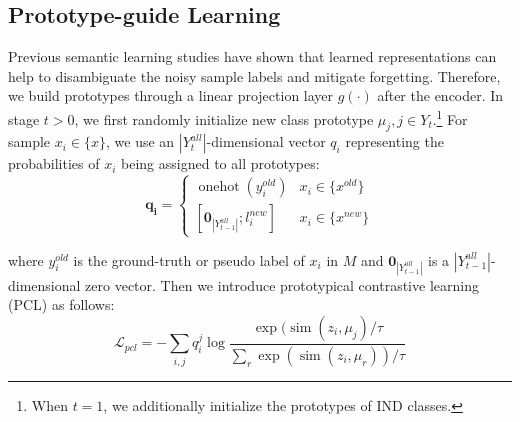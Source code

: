\documentclass[11pt]{article}
\begin{document}
\subsection{Prototype-guide Learning}
Previous semantic learning studies \cite{yu2020semantic,wang2022pico,ma-etal-2022-decomposed,10095149,dong2023multitask} have shown that learned representations can help to disambiguate the noisy sample labels and mitigate forgetting. Therefore, we build prototypes through a linear projection layer $g(\cdot)$ after the encoder.
In stage $t>0$, we first randomly initialize new class prototype $\mu_j,j\in Y_t$.\footnote{When $t=1$, we additionally initialize the prototypes of IND classes. } For sample $x_i\in \{x\}$, we use an $|Y^{all}_t|$-dimensional vector $q_{i}$ representing the probabilities of $x_i$ being assigned to all prototypes:
\begin{equation}
\boldsymbol{q_i}= \begin{cases}{\operatorname{onehot}(y^{old}_i)} & {x_i} \in \{x^{old}\} \\ {\left[\mathbf{0}_{|Y^{all}_{t-1}|}; l_{i}^{new}\right]} & {x_i} \in \{x^{new}\}\end{cases}
\end{equation}

where $y^{old}_i$ is the ground-truth or pseudo label of $x_i$ in $M$ and $\mathbf{0}_{|Y^{all}_{t-1}|}$ is a $|Y^{all}_{t-1}|$-dimensional zero vector. Then we introduce prototypical contrastive learning (PCL) \cite{li2020prototypical} as follows:
\begin{equation}
    \mathcal{L}_{pcl}=-\sum_{i,j}q^j_i\operatorname{log}\frac{\operatorname{exp}(\operatorname{sim}(z_i,\mu_j)/\tau}{\sum_{r}\operatorname{exp}(\operatorname{sim}(z_i,\mu_r))/\tau}
\end{equation}
\end{document}
